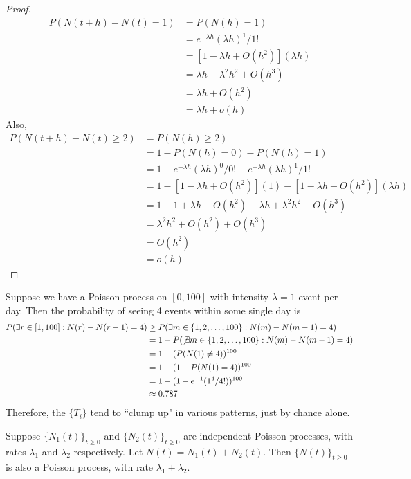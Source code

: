 \documentclass[11pt]{article}
\begin{document}
   	\begin{proof}
   		\begin{align}
   			P(N(t+h) - N(t) = 1) &= P(N(h) = 1) \\
   			&= e^{- \lambda h}(\lambda h)^1 / 1! \\
   			&= [1 -\lambda h + O(h^2)](\lambda h)\\
   			&= \lambda h - \lambda^2h^2 + O(h^3) \\
   			&= \lambda h + O(h^2) \\
   			&= \lambda h + o(h) 
   		\end{align}
   		Also,
   		\begin{align}
   			P(N(t+h) - N(t) \geq 2) &= P(N(h) \geq 2) \\
   			&= 1 - P(N(h) = 0) - P(N(h) = 1) \\
   			&= 1 - e^{- \lambda h}(\lambda h)^0 / 0! - e^{- \lambda h}(\lambda h)^1 / 1!\\
   			&= 1 - [1 - \lambda h + O(h^2)](1) - [1 - \lambda h + O(h^2)](\lambda h) \\
   			&= 1 - 1 + \lambda h - O(h^2) - \lambda h + \lambda^2 h^2 - O(h^3) \\
   			&= \lambda^2 h^2 + O(h^2) + O(h^3)\\
   			&= O(h^2)\\
   			&= o(h) 
   		\end{align}
   	\end{proof}
    Suppose we have a Poisson process on $[0, 100]$ with intensity $\lambda = 1$ event per day. Then the probability of seeing 4 events within some single day is
    \begin{align*}
    	P(\exists r \in [1, 100]: N(r) - N(r-1) = 4) &\geq P(\exists m \in \{1,2,\hdots, 100\}: N(m) - N(m-1) = 4) \\
    	&= 1 - P(\not \exists m \in \{1,2,\hdots,100\}: N(m) - N(m-1) = 4)\\
    	&= 1 - (P(N(1) \neq 4))^{100} \\
    	&= 1 - (1 - P(N(1) = 4))^{100} \\
    	&= 1 - (1 - e^{-1}(1^4/4!))^{100}\\
    	&\approx 0.787
    \end{align*}
    Therefore, the $\{T_i\}$ tend to ``clump up" in various patterns, just by chance alone.
    
    \proposition
    Suppose $\{N_1(t)\}_{t\geq 0}$ and $\{N_2(t)\}_{t\geq 0}$ are independent Poisson processes, with rates $\lambda_1$ and $\lambda_2$ respectively. Let $N(t) = N_1(t) + N_2(t)$. Then $\{N(t)\}_{t \geq 0}$ is also a Poisson process, with rate $\lambda_1 + \lambda_2$.
    
\end{document}
